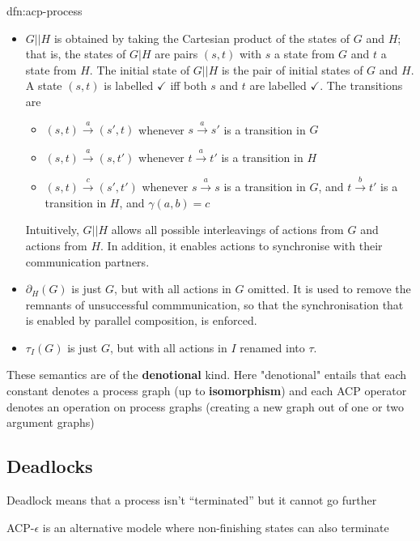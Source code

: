 \documentclass{article}
\begin{document}
\begin{dfn}{dfn:acp-process}{}
\begin{itemize}
            \textbf{root} is labelled with $\checkmark$ if either $I_{G}$ or $I_{H}$ is.
        \item $G | | H$ is obtained by taking the Cartesian product of the states of $G$ and $H$; that is, the states of $G | H$ are pairs $(s, t)$ with $s$ a state from $G$ and $t$ a state from $H$. The initial state of $G | | H$ is the pair of initial states of $G$ and $H$. A state $(s, t)$ is labelled $\checkmark$ iff both $s$ and $t$ are labelled $\checkmark$. The transitions are
            \begin{itemize}
                \item $(s, t) \xrightarrow{a} (s', t)$ whenever $s \xrightarrow{a} s'$ is a transition in $G$
                \item $(s, t) \xrightarrow{a} (s, t')$ whenever $t \xrightarrow{a} t'$ is a transition in $H$
                \item $(s, t) \xrightarrow{c} (s', t')$ whenever $s \xrightarrow{a} s$ is a transition in $G$, and $t \xrightarrow{b} t'$ is a transition in $H$, and $\gamma(a,b) = c$
            \end{itemize}
        Intuitively, $G | | H$ allows all possible interleavings of actions from $G$ and actions from $H$. In addition, it enables actions to synchronise with their communication partners.
        \item $\partial_{H}(G)$ is just $G$, but with all actions in $G$ omitted. It is used to remove the remnants of unsuccessful commmunication, so that the synchronisation that is enabled by parallel composition, is enforced.
        \item $\tau_{I}(G)$ is just $G$, but with all actions in $I$ renamed into $\tau$.
    \end{itemize}
\end{dfn}

These semantics are of the \textbf{denotional} kind. Here "denotional" entails that each constant denotes a process graph (up to \textbf{isomorphism}) and each ACP operator denotes an operation on process graphs (creating a new graph out of one or two argument graphs)

\subsection{Deadlocks}
Deadlock means that a process isn't ``terminated'' but it cannot go further

ACP-$\epsilon$ is an alternative modele where non-finishing states can also terminate
\end{document}

